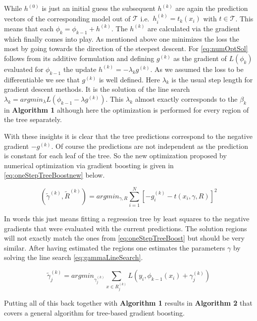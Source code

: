 \documentclass[
]{book}
\begin{document}
While \(h^{(0)}\) is just an initial guess the subsequent \(h^{(k)}\) are again the prediction vectors of the corresponding model out of \(\mathcal{T}\) i.e.~\(h^{(k)}_{i} = t_k(x_i)\) with \(t \in \mathcal{T}\). This means that each \(\phi_k = \phi_{k-1} + h^{(k)}\). The \(h^{(k)}\) are calculated via the gradient which finally comes into play. As mentioned above one minimizes the loss the most by going towards the direction of the steepest descent. For \eqref{eq:numOptSol} follows from its additive formulation and defining \(g^{(k)}\) as the gradient of \(L(\phi_k)\) evaluated for \(\phi_{k-1}\) the update \(h^{(k)} = -\lambda_k g^{(k)}\). As we assumed the loss to be differentiable we see that \(g^{(k)}\) is well defined. Here \(\lambda_k\) is the usual step length for gradient descent methods. It is the solution of the line search \(\lambda_k = argmin_{\lambda} L(\phi_{k-1} - \lambda g^{(k)})\). This \(\lambda_k\) almost exactly corresponds to the \(\beta_k\) in \textbf{Algorithm 1} although here the optimization is performed for every region of the tree separately.\citep{elements}

With these insights it is clear that the tree predictions correspond to the negative gradient \(-g^{(k)}\). Of course the predictions are not independent as the prediction is constant for each leaf of the tree. So the new optimization proposed by numerical optimization via gradient boosting is given in \eqref{eq:oneStepTreeBoostnew} below.

\begin{equation}
  (\tilde{\gamma}^{(k)},\tilde{R}^{(k)}) = argmin_{\gamma,R} \sum_{i=1}^N [-g^{(k)}_{i} -  t(x_i,\gamma,R)] ^2
  \label{eq:oneStepTreeBoostnew}
\end{equation}

In words this just means fitting a regression tree by least squares to the negative gradients that were evaluated with the current predictions. The solution regions will not exactly match the ones from \eqref{eq:oneStepTreeBoost} but should be very similar.\citep{elements} After having estimated the regions one estimates the parameters \(\gamma\) by solving the line search \eqref{eq:gammaLineSearch}.

\begin{equation}
  \tilde{\gamma}^{(k)}_{j} = argmin_{\gamma^{(k)}_{j}} \sum_{x \in R^{(k)}_{j}} L(y_i,\phi_{k-1}(x_i) + \gamma^{(k)}_{j})
  \label{eq:gammaLineSearch}
\end{equation}

Putting all of this back together with \textbf{Algorithm 1} results in \textbf{Algorithm 2} that covers a general algorithm for tree-based gradient boosting.
\end{document}

